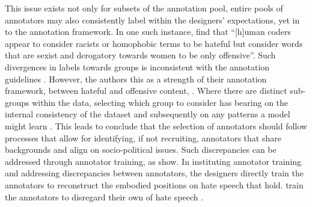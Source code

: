 This issue exists not only for subsets of the annotation pool, entire pools of annotators may also consistently label within the designers' expectations, yet in  to the annotation framework.
In one such instance, \citet{Davidson:2017} find that ``[h]uman coders appear to consider racists or homophobic terms to be hateful but consider words that are sexist and derogatory towards women to be only offensive''.
Such divergences in labels towards groups is inconsistent with the annotation guidelines . 
However, the authors  this as a strength of their annotation framework,  between hateful and offensive content, .
Where there are distinct sub-groups within the data, selecting which group to consider has bearing on the internal consistency of the dataset and subsequently on any patterns a model might learn \citep{Waseem:2016}.
This leads \citep{Waseem:2016} to conclude that the selection of annotators should follow processes that allow for identifying, if not recruiting, annotators that share backgrounds and align on socio-political issues.
Such discrepancies can  be addressed through annotator training, as \citet{Vidgen:2020} show.
In instituting annotator training and addressing discrepancies between annotators, the designers directly train the annotators to reconstruct the embodied positions on hate speech that  hold.
 train the annotators to disregard their own  of  hate speech .

